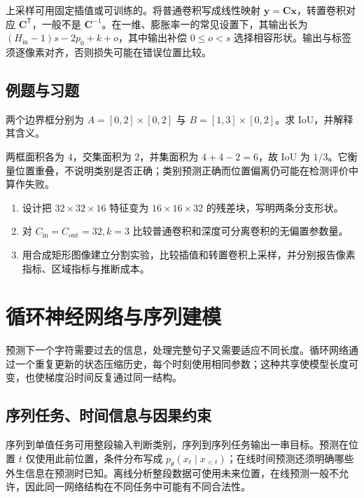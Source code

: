 \documentclass[UTF8,12pt,a4paper,fontset=fandol]{ctexbook}
\begin{document}
上采样可用固定插值或可训练的。将普通卷积写成线性映射 $\mathbf y=\mathbf C\mathbf x$，转置卷积对应 $\mathbf C^\mathsf T$，一般不是 $\mathbf C^{-1}$。在一维、膨胀率一的常见设置下，其输出长为 $(H_{\mathrm{in}}-1)s-2p_0+k+o$，其中输出补偿 $0\leq o<s$ 选择相容形状。输出与标签须逐像素对齐，否则损失可能在错误位置比较。

\section{例题与习题}
\begin{example}[区域重叠]
两个边界框分别为 $A=[0,2]\times[0,2]$ 与 $B=[1,3]\times[0,2]$。求 IoU，并解释其含义。
\end{example}
\begin{solve}
两框面积各为 $4$，交集面积为 $2$，并集面积为 $4+4-2=6$，故 IoU 为 $1/3$。它衡量位置重叠，不说明类别是否正确；类别预测正确而位置偏离仍可能在检测评价中算作失败。
\end{solve}
\begin{enumerate}
\item 设计把 $32\times32\times16$ 特征变为 $16\times16\times32$ 的残差块，写明两条分支形状。
\item 对 $C_{\mathrm{in}}=C_{\mathrm{out}}=32,k=3$ 比较普通卷积和深度可分离卷积的无偏置参数量。
\item 用合成矩形图像建立分割实验，比较插值和转置卷积上采样，并分别报告像素指标、区域指标与推断成本。
\end{enumerate}

\chapter{循环神经网络与序列建模}
\label{chap:dl-rnn}
预测下一个字符需要过去的信息，处理完整句子又需要适应不同长度。循环网络通过一个重复更新的状态压缩历史，每个时刻使用相同参数；这种共享使模型长度可变，也使梯度沿时间反复通过同一结构。

\section{序列任务、时间信息与因果约束}
序列到单值任务可用整段输入判断类别，序列到序列任务输出一串目标。预测在位置 $t$ 仅使用此前位置，条件分布写成 $p_\theta(x_t\mid x_{<t})$；在线时间预测还须明确哪些外生信息在预测时已知。离线分析整段数据可使用未来位置，在线预测一般不允许，因此同一网络结构在不同任务中可能有不同合法性。
\end{document}
